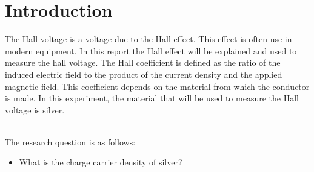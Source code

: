 \chapter{Introduction}

The Hall voltage is a voltage due to the Hall effect. This effect is often use in modern equipment. In this report the Hall effect will be explained and used to measure the hall voltage. The Hall coefficient is defined as the ratio of the induced electric field to the product of the current density and the applied magnetic field. This coefficient depends on the material from which the conductor is made. In this experiment, the material that will be used to measure the Hall voltage is silver. 

\\
The research question is as follows:
 \begin{itemize}
     \item  What is the charge carrier density of silver?
 \end{itemize}
 
 




 
